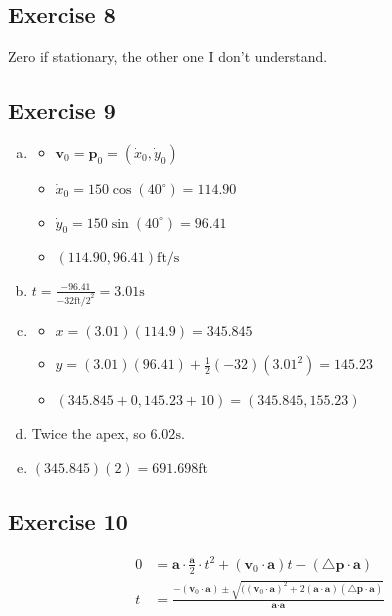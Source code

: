 \documentclass[11pt]{article}
\begin{document}
\subsection{Exercise 8}

Zero if stationary, the other one I don't understand.

\subsection{Exercise 9}

\begin{enumerate}[a.]
	\item %
		\begin{itemize}
			\item $\textbf{v}_0 = \textbf{p}_0 = (\dot{x}_0, \dot{y}_0)$
			\item $\dot{x}_0 = 150 \cos (40^{\circ}) = 114.90$
			\item $\dot{y}_0 = 150 \sin (40^{\circ}) = 96.41$
			\item $(114.90, 96.41) \text{ft/s}$
		\end{itemize}
	\item %
		$t = \frac{-96.41}{-32\text{ft/2}^2} = 3.01\text{s}$
	\item %
		\begin{itemize}
			\item $x = (3.01)(114.9) = 345.845$
			\item $y = (3.01)(96.41) + \frac{1}{2}(-32)(3.01^2) = 145.23$
			\item $(345.845 + 0, 145.23 + 10) = (345.845, 155.23)$
		\end{itemize}
	\item %
		Twice the apex, so $6.02\text{s}$.
	\item %
		$(345.845)(2) = 691.698 \text{ft}$
\end{enumerate}

\subsection{Exercise 10}

\begin{align*}
0 &= \textbf{a} \cdot{} \frac{\textbf{a}}{2} \cdot{} t^2 + (\textbf{v}_0 \cdot{} \textbf{a})t - (\bigtriangleup \textbf{p} \cdot{} \textbf{a}) \\
t &= \frac{-(\textbf{v}_0 \cdot{} \textbf{a}) \pm \sqrt{((\textbf{v}_0 \cdot{} \textbf{a})^2+2(\textbf{a} \cdot \textbf{a})(\bigtriangleup \textbf{p} \cdot{} \textbf{a})}}{\textbf{a} \cdot{} \textbf{a}}
\end{align*}
\end{document}
